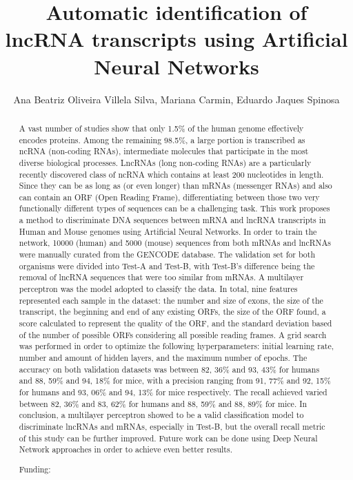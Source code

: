 \documentclass[twoside]{article}
\title{\vspace{-15mm}\fontsize{24pt}{10pt}\selectfont\textbf{ Automatic identification of lncRNA transcripts using Artificial Neural Networks }} %
\author{ Ana Beatriz Oliveira Villela Silva, Mariana Carmin, Eduardo Jaques Spinosa }
\affil{ Universidade Federal do Paran\'a }
\date{}
\begin{document}
  
  
  \maketitle %
  
  
  \thispagestyle{fancy} %
  
  
  \begin{abstract}
  A vast number of studies show that only 1.5\% of the human genome effectively encodes proteins. Among the remaining 98.5\%,  a large portion is transcribed as ncRNA (non-coding RNAs),  intermediate molecules that participate in the most diverse biological processes. LncRNAs (long non-coding RNAs) are a particularly recently discovered class of ncRNA which contains at least 200 nucleotides in length. Since they can be as long as (or even longer) than mRNAs (messenger RNAs) and also can contain an ORF (Open Reading Frame),  differentiating between those two very functionally different types of sequences can be a challenging task. This work proposes a method to discriminate DNA sequences between mRNA and lncRNA transcripts in Human and Mouse genomes using Artificial Neural Networks. In order to train the network,  10000 (human) and 5000 (mouse) sequences from both mRNAs and lncRNAs were manually curated from the GENCODE database. The validation set for both organisms were divided into Test-A and Test-B,  with Test-B's difference being the removal of lncRNA sequences that were too similar from mRNAs. A multilayer perceptron was the model adopted to classify the data.
In total,  nine features represented each sample in the dataset: the number and size of exons,  the size of the transcript,  the beginning and end of any existing ORFs,  the size of the ORF found,  a score calculated to represent the quality of the ORF,  and the standard deviation based of the number of possible ORFs considering all possible reading frames.  A grid search was performed in order to optimize the following hyperparameters: initial learning rate,  number and amount of hidden layers,  and the maximum number of epochs.  The accuracy on both validation datasets was between 82, 36\% and 93, 43\% for humans and 88, 59\% and 94, 18\% for mice,  with a precision ranging from 91, 77\% and 92, 15\% for humans and 93, 06\% and 94, 13\% for mice respectively. The recall achieved varied between 82, 36\% and 83, 62\% for humans and 88, 59\% and 88, 89\% for mice.  In conclusion,  a multilayer perceptron showed to be a valid classification model to discriminate lncRNAs and mRNAs,  especially in Test-B,  but the overall recall metric of this study can be further improved. Future work can be done using Deep Neural Network approaches in order to achieve even better results.
  
  Funding:  \\ 
  \end{abstract}
  
\end{document}
